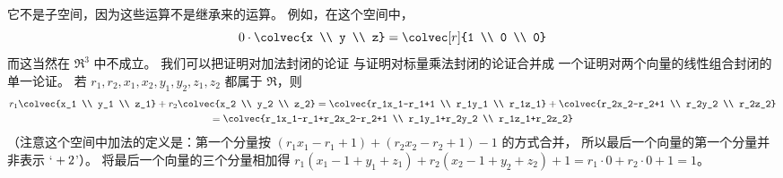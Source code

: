     \begin{answer}
      \begin{exparts}
         \partsitem 它不是子空间，因为这些运算不是继承来的运算。  
           例如，在这个空间中，
           \begin{equation*}
             0\cdot\colvec{x \\ y \\ z}=\colvec[r]{1 \\ 0 \\ 0}
           \end{equation*}
           而这当然在 $\Re^3$ 中不成立。
         \partsitem 我们可以把证明对加法封闭的论证
           与证明对标量乘法封闭的论证合并成
           一个证明对两个向量的线性组合封闭的单一论证。
           若 $r_1,r_2,x_1,x_2,y_1,y_2,z_1,z_2$ 都属于 $\Re$，则      
           \begin{multline*}
              r_1\colvec{x_1 \\ y_1 \\ z_1}
              +r_2\colvec{x_2 \\ y_2 \\ z_2}
              =\colvec{r_1x_1-r_1+1 \\ r_1y_1 \\ r_1z_1}
               +\colvec{r_2x_2-r_2+1 \\ r_2y_2 \\ r_2z_2}                 \\
            =\colvec{r_1x_1-r_1+r_2x_2-r_2+1 \\ r_1y_1+r_2y_2 \\ r_1z_1+r_2z_2}
           \end{multline*} 
           （注意这个空间中加法的定义是：第一个分量按
           $(r_1x_1-r_1+1)+(r_2x_2-r_2+1)-1$ 的方式合并，
           所以最后一个向量的第一个分量并非表示
           `$\hbox{}+2$'）。
           将最后一个向量的三个分量相加得
           $r_1(x_1-1+y_1+z_1)+r_2(x_2-1+y_2+z_2)+1=r_1\cdot0+r_2\cdot0+1=1$。


\end{exparts}
\end{answer}

